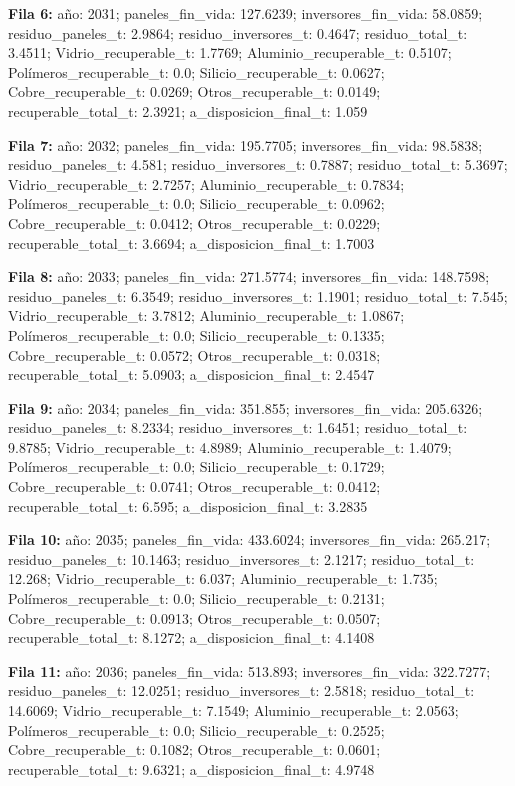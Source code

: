 {\footnotesize\textbf{Fila 6:} año: 2031; paneles\_fin\_vida: 127.6239; inversores\_fin\_vida: 58.0859; residuo\_paneles\_t: 2.9864; residuo\_inversores\_t: 0.4647; residuo\_total\_t: 3.4511; Vidrio\_recuperable\_t: 1.7769; Aluminio\_recuperable\_t: 0.5107; Polímeros\_recuperable\_t: 0.0; Silicio\_recuperable\_t: 0.0627; Cobre\_recuperable\_t: 0.0269; Otros\_recuperable\_t: 0.0149; recuperable\_total\_t: 2.3921; a\_disposicion\_final\_t: 1.059\par}
{\footnotesize\textbf{Fila 7:} año: 2032; paneles\_fin\_vida: 195.7705; inversores\_fin\_vida: 98.5838; residuo\_paneles\_t: 4.581; residuo\_inversores\_t: 0.7887; residuo\_total\_t: 5.3697; Vidrio\_recuperable\_t: 2.7257; Aluminio\_recuperable\_t: 0.7834; Polímeros\_recuperable\_t: 0.0; Silicio\_recuperable\_t: 0.0962; Cobre\_recuperable\_t: 0.0412; Otros\_recuperable\_t: 0.0229; recuperable\_total\_t: 3.6694; a\_disposicion\_final\_t: 1.7003\par}
{\footnotesize\textbf{Fila 8:} año: 2033; paneles\_fin\_vida: 271.5774; inversores\_fin\_vida: 148.7598; residuo\_paneles\_t: 6.3549; residuo\_inversores\_t: 1.1901; residuo\_total\_t: 7.545; Vidrio\_recuperable\_t: 3.7812; Aluminio\_recuperable\_t: 1.0867; Polímeros\_recuperable\_t: 0.0; Silicio\_recuperable\_t: 0.1335; Cobre\_recuperable\_t: 0.0572; Otros\_recuperable\_t: 0.0318; recuperable\_total\_t: 5.0903; a\_disposicion\_final\_t: 2.4547\par}
{\footnotesize\textbf{Fila 9:} año: 2034; paneles\_fin\_vida: 351.855; inversores\_fin\_vida: 205.6326; residuo\_paneles\_t: 8.2334; residuo\_inversores\_t: 1.6451; residuo\_total\_t: 9.8785; Vidrio\_recuperable\_t: 4.8989; Aluminio\_recuperable\_t: 1.4079; Polímeros\_recuperable\_t: 0.0; Silicio\_recuperable\_t: 0.1729; Cobre\_recuperable\_t: 0.0741; Otros\_recuperable\_t: 0.0412; recuperable\_total\_t: 6.595; a\_disposicion\_final\_t: 3.2835\par}
{\footnotesize\textbf{Fila 10:} año: 2035; paneles\_fin\_vida: 433.6024; inversores\_fin\_vida: 265.217; residuo\_paneles\_t: 10.1463; residuo\_inversores\_t: 2.1217; residuo\_total\_t: 12.268; Vidrio\_recuperable\_t: 6.037; Aluminio\_recuperable\_t: 1.735; Polímeros\_recuperable\_t: 0.0; Silicio\_recuperable\_t: 0.2131; Cobre\_recuperable\_t: 0.0913; Otros\_recuperable\_t: 0.0507; recuperable\_total\_t: 8.1272; a\_disposicion\_final\_t: 4.1408\par}
{\footnotesize\textbf{Fila 11:} año: 2036; paneles\_fin\_vida: 513.893; inversores\_fin\_vida: 322.7277; residuo\_paneles\_t: 12.0251; residuo\_inversores\_t: 2.5818; residuo\_total\_t: 14.6069; Vidrio\_recuperable\_t: 7.1549; Aluminio\_recuperable\_t: 2.0563; Polímeros\_recuperable\_t: 0.0; Silicio\_recuperable\_t: 0.2525; Cobre\_recuperable\_t: 0.1082; Otros\_recuperable\_t: 0.0601; recuperable\_total\_t: 9.6321; a\_disposicion\_final\_t: 4.9748\par}
